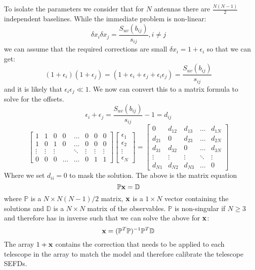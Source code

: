 			To isolate the parameters we consider that for $N$ antennas there are $\frac{N(N-1)}{2}$ independent baselines. While the immediate problem is non-linear:
			\begin{equation}
				\delta x_i \delta x_j = \frac{S_{uv}(b_{ij})}{s_{ij}}, i\not=j
			\end{equation}
			we can assume that the required corrections are small $\delta x_i = 1 + \epsilon_i$ so that we can get:
			\begin{equation}
				(1 + \epsilon_i) (1 + \epsilon_j) = (1 + \epsilon_i + \epsilon_j + \epsilon_i\epsilon_j) = \frac{S_{uv}(b_{ij})}{s_{ij}}
			\end{equation}
			 and it is likely that $\epsilon_i\epsilon_j \ll 1$. We now can convert this to a matrix formula to solve for the offsets.
			 \begin{equation}
				 \epsilon_i + \epsilon_j = \frac{S_{uv}(b_{ij})}{s_{ij}}-1 = d_{ij}
			 \end{equation}
			 \[
			\begin{bmatrix}
				1 		& 1 		& 0 		& 0 	& \dots		& 0	  		& 0      & 0\\
				1 		& 0 		& 1 		& 0     & \dots 	& 0  		& 0      & 0\\
				\vdots 	& \vdots 	& \vdots 	& 		& \ddots	& \vdots 	& \vdots & \vdots\\
				0 	    & 0 	    & 0   	    & \dots &\dots    	& 0	     	& 1      & 1
			\end{bmatrix}
			\begin{bmatrix}
				\epsilon_1 		\\
				\epsilon_2 		\\
				\vdots 	\\
				\epsilon_N 	    
			\end{bmatrix}
				=
			\begin{bmatrix}
				0 & d_{12} & d_{13} & \dots  & d_{1N} \\
				d_{21} & 0 & d_{23} & \dots  & d_{2N} \\
				d_{31} & d_{32} & 0 & \dots  & d_{3N} \\
				\vdots & \vdots & \vdots & \ddots & \vdots \\
				d_{N1} & d_{N2} & d_{N3} & \dots  & 0
			\end{bmatrix}
			\]
			Where we set $d_{ii}=0$ to mask the solution. The above is the matrix equation $$\mathbb{P}{\bf x}=\mathbb{D}$$ where $\mathbb{P}$ is a $N\times N(N-1)/2$ matrix, ${\bf x}$ is a $1\times N$ vector containing the solutions and $\mathbb{D}$ is a $N\times N$ matrix of the observables. $\mathbb{P}$ is non-singular if $N\ge3$ and therefore has in inverse such that we can solve the above for ${\bf x}$:
			\begin{equation}
				{\bf x} = (\mathbb{P}^{T}\mathbb{P})^{-1}\mathbb{P}^{T}\mathbb{D}
			\end{equation}
			The array $1+{\bf x}$ contains the correction that needs to be applied to each telescope in the array to match the model and therefore calibrate the telescope SEFDs.

